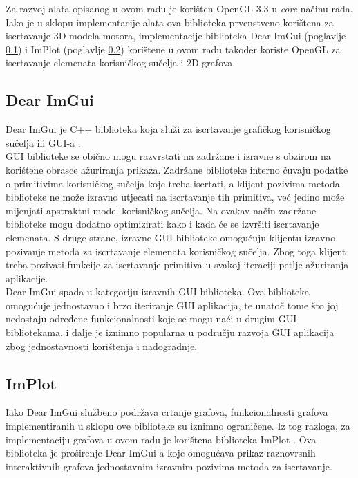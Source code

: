 \documentclass[times, utf8, diplomski]{fer}
\begin{document}
Za razvoj alata opisanog u ovom radu je korišten OpenGL 3.3 u \textit{core} načinu rada. Iako je u sklopu implementacije alata ova biblioteka prvenstveno korištena za iscrtavanje 3D modela motora, implementacije biblioteka Dear ImGui (poglavlje \ref{imgui-section}) i ImPlot (poglavlje \ref{implot-section}) korištene u ovom radu također koriste OpenGL za iscrtavanje elemenata korisničkog sučelja i 2D grafova.

\subsection{Dear ImGui} \label{imgui-section}
Dear ImGui \citep{imgui} je C++ biblioteka koja služi za iscrtavanje grafičkog korisničkog sučelja ili GUI-a .\\

GUI biblioteke se obično mogu razvrstati na zadržane  i izravne  s obzirom na korištene obrasce ažuriranja prikaza. Zadržane biblioteke interno čuvaju podatke o primitivima korisničkog sučelja koje treba iscrtati, a klijent pozivima metoda biblioteke ne može izravno utjecati na iscrtavanje tih primitiva, već jedino može mijenjati apstraktni model korisničkog sučelja. Na ovakav način zadržane biblioteke mogu dodatno optimizirati kako i kada će se izvršiti iscrtavanje elemenata. S druge strane, izravne GUI biblioteke omogućuju klijentu izravno pozivanje metoda za iscrtavanje elemenata korisničkog sučelja. Zbog toga klijent treba pozivati funkcije za iscrtavanje primitiva u svakoj iteraciji petlje ažuriranja aplikacije.\\

Dear ImGui spada u kategoriju izravnih GUI biblioteka. Ova biblioteka omogućuje jednostavno i brzo iteriranje GUI aplikacija, te unatoč tome što joj nedostaju određene funkcionalnosti koje se mogu naći u drugim GUI bibliotekama, i dalje je iznimno popularna u području razvoja GUI aplikacija zbog jednostavnosti korištenja i nadogradnje.

\subsection{ImPlot} \label{implot-section}

Iako Dear ImGui službeno podržava crtanje grafova, funkcionalnosti grafova implementiranih u sklopu ove biblioteke su iznimno ograničene. Iz tog razloga, za implementaciju grafova u ovom radu je korištena biblioteka ImPlot \citep{implot}. Ova biblioteka je proširenje Dear ImGui-a koje omogućava prikaz raznovrsnih interaktivnih grafova jednostavnim izravnim pozivima metoda za iscrtavanje. 
\end{document}
